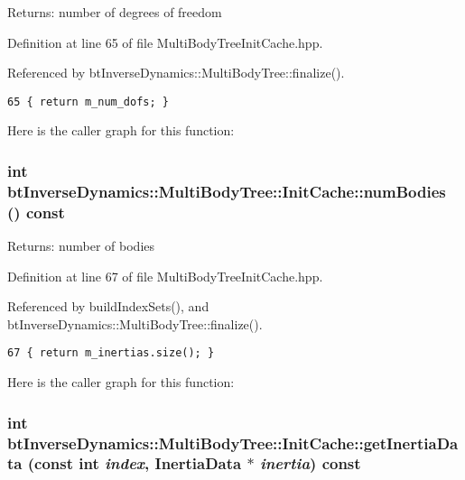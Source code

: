 \begin{Desc}
\item[Returns:]number of degrees of freedom \end{Desc}


Definition at line 65 of file MultiBodyTreeInitCache.hpp.

Referenced by btInverseDynamics::MultiBodyTree::finalize().

\begin{Code}\begin{verbatim}65 { return m_num_dofs; }
\end{verbatim}
\end{Code}




Here is the caller graph for this function:\hypertarget{classbt_inverse_dynamics_1_1_multi_body_tree_1_1_init_cache_6203870a6e9093f6c26280feaee27832}{
\subsubsection[numBodies]{\setlength{\rightskip}{0pt plus 5cm}int btInverseDynamics::MultiBodyTree::InitCache::numBodies () const}}
\label{classbt_inverse_dynamics_1_1_multi_body_tree_1_1_init_cache_6203870a6e9093f6c26280feaee27832}


\begin{Desc}
\item[Returns:]number of bodies \end{Desc}


Definition at line 67 of file MultiBodyTreeInitCache.hpp.

Referenced by buildIndexSets(), and btInverseDynamics::MultiBodyTree::finalize().

\begin{Code}\begin{verbatim}67 { return m_inertias.size(); }
\end{verbatim}
\end{Code}




Here is the caller graph for this function:\hypertarget{classbt_inverse_dynamics_1_1_multi_body_tree_1_1_init_cache_ee00442cb04aaf00db41cac11b046567}{
\subsubsection[getInertiaData]{\setlength{\rightskip}{0pt plus 5cm}int btInverseDynamics::MultiBodyTree::InitCache::getInertiaData (const int {\em index}, \/  {\bf InertiaData} $\ast$ {\em inertia}) const}}
\label{classbt_inverse_dynamics_1_1_multi_body_tree_1_1_init_cache_ee00442cb04aaf00db41cac11b046567}


